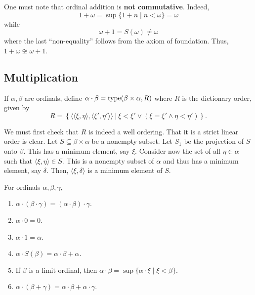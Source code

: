 \begin{remark}
    One must note that ordinal addition is \textbf{not commutative}. Indeed, 
    \begin{equation*}
        1 + \omega = \sup\{1 + n\mid n < \omega\} = \omega
    \end{equation*}
    while 
    \begin{equation*}
        \omega + 1 = S(\omega)\ne\omega
    \end{equation*}
    where the last ``non-equality'' follows from the axiom of foundation. Thus, $1 + \omega\not\cong\omega + 1$.
\end{remark}

\subsection*{Multiplication}

\begin{definition}
    If $\alpha,\beta$ are ordinals, define $\alpha\cdot\beta = \operatorname{type}(\beta\times\alpha, R)$ where $R$ is the dictionary order, given by 
    \begin{equation*}
        R = \left\{\langle\langle\xi,\eta\rangle,\langle\xi',\eta'\rangle\rangle~\big\vert~\xi < \xi'\vee (\xi = \xi'\wedge\eta < \eta')\right\}.
    \end{equation*}
\end{definition}

We must first check that $R$ is indeed a well ordering. That it is a strict linear order is clear. Let $S\subseteq\beta\times\alpha$ be a nonempty subset. Let $S_1$ be the projection of $S$ onto $\beta$. This has a minimum element, say $\xi$. Consider now the set of all $\eta\in\alpha$ such that $\langle\xi,\eta\rangle\in S$. This is a nonempty subset of $\alpha$ and thus has a minimum element, say $\delta$. Then, $\langle\xi,\delta\rangle$ is a minimum element of $S$.

\begin{lemma}
    For ordinals $\alpha,\beta,\gamma$, 
    \begin{enumerate}[label=(\alph*)]
        \item $\alpha\cdot(\beta\cdot\gamma) = (\alpha\cdot\beta)\cdot\gamma$.
        \item $\alpha\cdot 0 = 0$.
        \item $\alpha\cdot 1 = \alpha$. 
        \item $\alpha\cdot S(\beta) = \alpha\cdot\beta + \alpha$. 
        \item If $\beta$ is a limit ordinal, then $\alpha\cdot\beta = \sup\{\alpha\cdot\xi\mid\xi < \beta\}$. 
        \item $\alpha\cdot(\beta + \gamma) = \alpha\cdot\beta + \alpha\cdot\gamma$.
    \end{enumerate}
\end{lemma}

